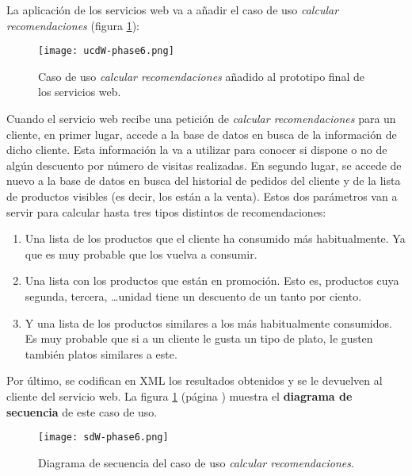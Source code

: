 La aplicación de los servicios web va a añadir el caso de uso \emph{calcular 
recomendaciones} (figura \ref{fig:ucdW-phase6}):

  \begin{figure}[H]
    \begin{center}
      \texttt{[image: ucdW-phase6.png]}
      \caption{Caso de uso \emph{calcular recomendaciones} añadido al prototipo
      final de los servicios web.}
      \label{fig:ucdW-phase6}
    \end{center}
  \end{figure}

Cuando el servicio web recibe una petición de \emph{calcular recomendaciones} 
para un cliente, en primer lugar, accede a la base de datos en busca de la
información de dicho cliente. Esta información la va a utilizar para conocer
si dispone o no de algún descuento por número de visitas realizadas. En
segundo lugar, se accede de nuevo a la base de datos en busca del historial
de pedidos del cliente y de la lista de productos visibles (es decir, los están
a la venta). Estos dos parámetros van a servir para calcular hasta tres tipos
distintos de recomendaciones:
\begin{enumerate}
\item Una lista de los productos que el cliente ha consumido más habitualmente. 
Ya que es muy probable que los vuelva a consumir.
\item Una lista con los productos que están en promoción. Esto es, productos 
cuya segunda, tercera, \dots unidad tiene un descuento de un tanto por ciento.
\item Y una lista de los productos similares a los más habitualmente 
consumidos. Es muy probable que si a un cliente le gusta un tipo de plato, le 
gusten también platos similares a este.
\end{enumerate}
Por último, se codifican en \acs{XML} los resultados obtenidos y se le
devuelven al cliente del servicio web. La figura \ref{fig:ucdW-phase6}
(página \pageref{fig:ucdW-phase6}) muestra el \textbf{diagrama de secuencia}
de este caso de uso.

  \begin{sidewaysfigure}[h]
    \begin{center}
      \texttt{[image: sdW-phase6.png]}
      \caption{Diagrama de secuencia del caso de uso \emph{calcular 
      recomendaciones}.}
      \label{fig:sdW-phase6}
    \end{center}
  \end{sidewaysfigure}

